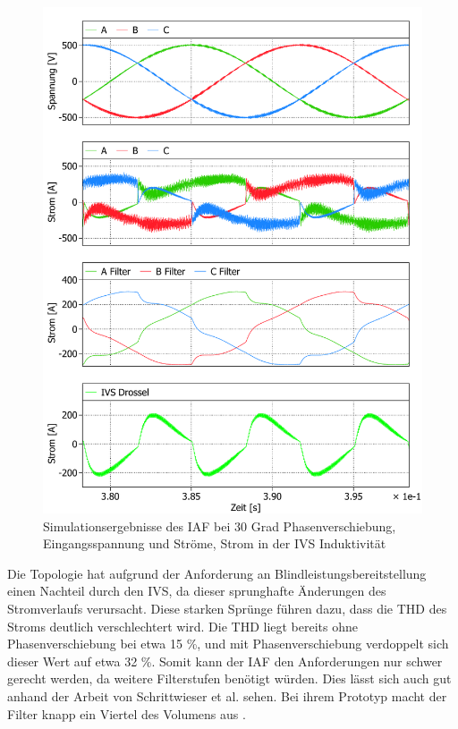 \begin{figure}
	\centering
	\includegraphics[width=1\linewidth]{content/Grafiken/IAF_AC+L_30Grad}
	\caption{Simulationsergebnisse des IAF bei 30 Grad Phasenverschiebung, Eingangsspannung und Ströme, Strom in der IVS Induktivität }
	\label{fig:iafacl30grad}
\end{figure}
Die Topologie hat aufgrund der Anforderung an Blindleistungsbereitstellung einen Nachteil durch den IVS, da dieser sprunghafte Änderungen des Stromverlaufs verursacht. Diese starken Sprünge führen dazu, dass die THD des Stroms deutlich verschlechtert wird. Die THD liegt bereits ohne Phasenverschiebung bei etwa 15 \%, und mit Phasenverschiebung verdoppelt sich dieser Wert auf etwa 32 \%.  Somit kann der IAF den Anforderungen nur schwer gerecht werden, da weitere Filterstufen benötigt würden. Dies lässt sich auch gut anhand der Arbeit von Schrittwieser et al. sehen. Bei ihrem Prototyp macht der Filter knapp ein Viertel des Volumens aus \cite{IAF99}.

